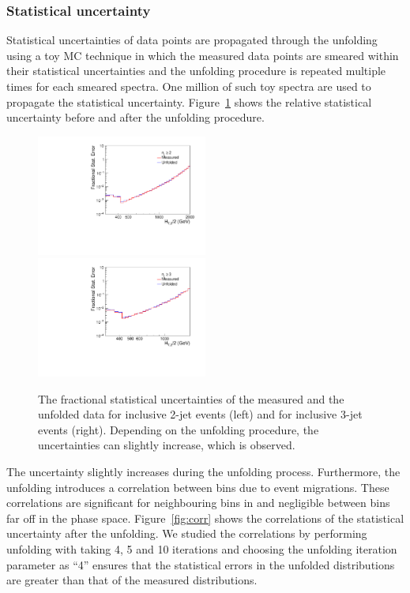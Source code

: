 \subsubsection{Statistical uncertainty}
\label{sec:unfolding_stat}
Statistical uncertainties of data points are propagated through the unfolding using a toy MC technique in which the measured data points 
are smeared within their statistical uncertainties and the unfolding procedure is repeated multiple times for each smeared
spectra. One million of such toy spectra are used to propagate the statistical uncertainty. Figure~\ref{fig:stat_unc} shows the relative 
statistical uncertainty before and after the unfolding procedure. 

\begin{figure}[!htbp]
  \begin{center}
    \includegraphics[width=0.5\textwidth]{Plots_HT_2_150/Comparison_stat_unc_2_HT_2_150.pdf}%
    \includegraphics[width=0.5\textwidth]{Plots_HT_2_150/Comparison_stat_unc_3_HT_2_150.pdf}
    \caption{The fractional statistical uncertainties of the measured and the unfolded data for inclusive 2-jet events (left) and for 
      inclusive 3-jet events (right). Depending on the unfolding procedure, the uncertainties can slightly increase, which is observed.}
    \label{fig:stat_unc}
  \end{center}
\end{figure}

The uncertainty slightly increases during the unfolding process. Furthermore, the unfolding introduces a correlation between bins due to
event migrations. These correlations are significant for neighbouring bins in \httwo and negligible between bins far off in the phase 
space. Figure~\ref{fig:corr} shows the correlations of the statistical uncertainty after the unfolding. We studied the correlations by 
performing unfolding with taking 4, 5 and 10 iterations and choosing the unfolding iteration parameter as ``4'' ensures that the 
statistical errors in the unfolded distributions are greater than that of the measured distributions. 

